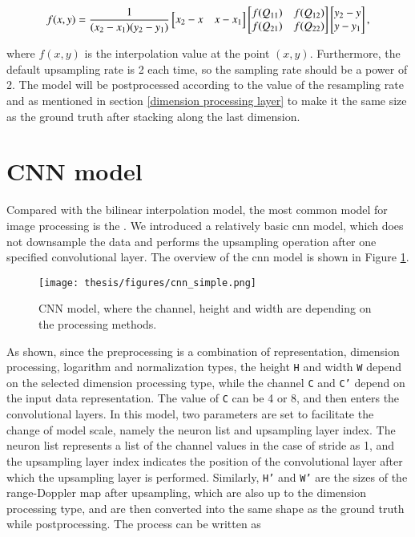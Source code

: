 \begin{equation}
    \centering
    f(x, y) = \frac{1}{(x_2 - x_1)(y_2 - y_1)}
    \begin{bmatrix}
    x_2 - x & x - x_1
    \end{bmatrix}
    \begin{bmatrix}
    f(Q_{11}) & f(Q_{12}) \\
    f(Q_{21}) & f(Q_{22})
    \end{bmatrix}
    \begin{bmatrix}
    y_2 - y \\
    y - y_1
    \end{bmatrix},
\end{equation}

where $f(x, y)$ is the interpolation value at the point $(x, y)$. Furthermore, the default upsampling rate is 2 each time, so the sampling rate should be a power of 2. The model will be postprocessed according to the value of the resampling rate and as mentioned in section \ref{dimension processing layer} to make it the same size as the ground truth after stacking along the last dimension.

\section{CNN model} \label{cnn model}
Compared with the bilinear interpolation model, the most common model for image processing is the . We introduced a relatively basic \gls{cnn} model, which does not downsample the data and performs the upsampling operation after one specified convolutional layer. The overview of the \gls{cnn} model is shown in Figure \ref{cnn model structure}.

\begin{figure}
	\centering
	\texttt{[image: thesis/figures/cnn\_simple.png]}
	\caption{CNN model, where the channel, height and width are depending on the processing methods.}
	\label{cnn model structure}
\end{figure}

As shown, since the preprocessing is a combination of representation, dimension processing, logarithm and normalization types, the height \texttt{H} and width \texttt{W} depend on the selected dimension processing type, while the channel \texttt{C} and \texttt{C'} depend on the input data representation. The value of \texttt{C} can be 4 or 8, and then enters the convolutional layers. In this model, two parameters are set to facilitate the change of model scale, namely the neuron list and upsampling layer index. The neuron list represents a list of the channel values in the case of stride as 1, and the upsampling layer index indicates the position of the convolutional layer after which the upsampling layer is performed. Similarly, \texttt{H'} and \texttt{W'} are the sizes of the range-Doppler map after upsampling, which are also up to the dimension processing type, and are then converted into the same shape as the ground truth while postprocessing. The process can be written as

